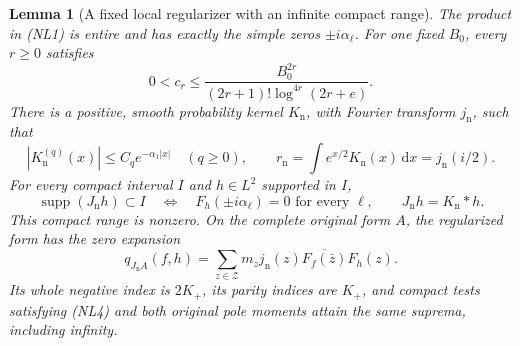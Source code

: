 \documentclass[11pt]{article}
\newtheorem{lemma}[theorem]{Lemma}
\theoremstyle{remark}\newtheorem{remark}[theorem]{Remark}
\newcommand{\dd}{\,\mathrm d}
\begin{document}
\begin{lemma}[A fixed local regularizer with an infinite compact range]
\label{lem:nearlinear-compact-range}
The product in (NL1) is entire and has exactly the simple zeros
\(\pm i\alpha_\ell\). For one fixed \(B_0\), every \(r\ge0\) satisfies
\[
 0<c_r\le
 \frac{B_0^{2r}}{(2r+1)!\log^{4r}(2r+e)}.                       \tag{NL2}
\]
There is a positive, smooth probability kernel \(K_{\mathrm n}\),
with Fourier transform \(j_{\mathrm n}\), such that
\[
 |K_{\mathrm n}^{(q)}(x)|\le C_qe^{-\alpha_1|x|}\quad(q\ge0),
 \qquad r_{\mathrm n}=\int e^{x/2}K_{\mathrm n}(x)\dd x
                        =j_{\mathrm n}(i/2).
                                                               \tag{NL3}
\]
For every compact interval \(I\) and \(h\in L^2\) supported in \(I\),
\[
 \operatorname{supp}(J_{\mathrm n}h)\subset I
 \quad\Longleftrightarrow\quad F_h(\pm i\alpha_\ell)=0
                 \text{ for every }\ell,\qquad
 J_{\mathrm n}h=K_{\mathrm n}*h.                                \tag{NL4}
\]
This compact range is nonzero. On the complete original form \(A\),
the regularized form has the zero expansion
\[
 q_{J_{\mathrm n}A}(f,h)
   =\sum_{z\in\mathcal Z}m_zj_{\mathrm n}(z)
                  \overline{F_f(\bar z)}F_h(z).                 \tag{NL5}
\]
Its whole negative index is \(2K_+\), its parity indices are \(K_+\),
and compact tests satisfying (NL4) and both original pole moments
attain the same suprema, including infinity.
\end{lemma}
\end{document}
